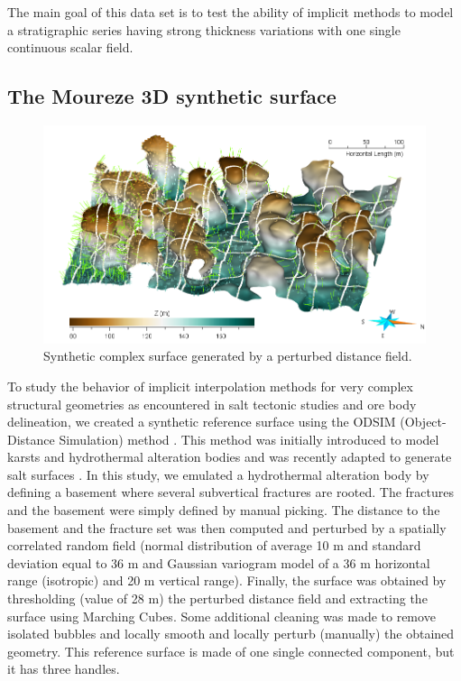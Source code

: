 \documentclass[preprint]{elsarticle}
\begin{document}
The main goal of this data set is to test the ability of implicit methods to model a stratigraphic series having strong thickness variations with one single continuous scalar field. 


\subsection{The Moureze 3D synthetic surface}

\begin{figure}
\centering\includegraphics[width=\textwidth]{Moureze}
\caption{Synthetic complex surface generated by a perturbed distance field.}
\label{fig:Moureze}
\end{figure}

To study the behavior of implicit interpolation methods for very complex structural geometries as encountered in salt tectonic studies and ore body delineation, we created a synthetic reference surface using the ODSIM (Object-Distance Simulation) method \citep{Henrion2010MG}. This method was initially introduced to model karsts and hydrothermal alteration bodies \citep{Henrion2008PEIGC,Rongier2014G} and was recently adapted to generate salt surfaces \citep{Clausolles20188ECE2}. In this study, we emulated a hydrothermal alteration body by defining a basement where several subvertical fractures are rooted. The fractures and the basement were simply defined by manual picking. The distance to the basement and the fracture set was then computed and perturbed by a spatially correlated random field (normal distribution of average 10 m and standard deviation equal to 36 m and Gaussian variogram model of a 36 m horizontal range (isotropic) and 20 m vertical range). Finally, the surface was obtained 
by thresholding (value of 28 m) the perturbed distance field and extracting the surface using Marching Cubes. Some additional cleaning was made to remove isolated bubbles and locally smooth and locally perturb (manually) the obtained geometry. This reference surface is made of one single connected component, but it has three handles.  
\end{document}
